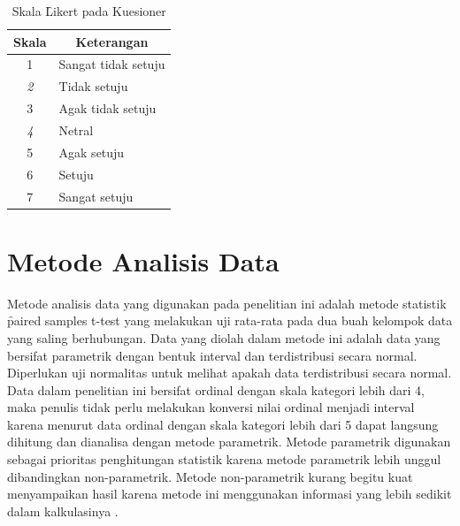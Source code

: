 \begin{enumerate}
\begin{enumerate}
		\begin{table}
			\centering
			\caption{Skala \f{Likert} pada Kuesioner}
			\label{tab:tab2}
			\begin{tabular}{|c|l|}
				\hline
				{\bf Skala} & \multicolumn{1}{c|}{{\bf Keterangan}} \\ \hline
				1           & Sangat tidak setuju                   \\ \hline
				{\it 2}     & Tidak setuju                          \\ \hline
				3           & Agak tidak setuju                     \\ \hline
				{\it 4}     & Netral                                \\ \hline
				5           & Agak setuju                           \\ \hline
				6           & Setuju                                \\ \hline
				7           & Sangat setuju                         \\ \hline                      
			\end{tabular}
		\end{table}
	\end{enumerate}
\end{enumerate}
\section{Metode Analisis Data} \label{subsec:analisis}
Metode analisis data yang digunakan pada penelitian ini adalah metode statistik \f{paired samples t-test} yang melakukan uji rata-rata pada dua buah kelompok data yang saling berhubungan. Data yang diolah dalam metode ini adalah data yang bersifat parametrik dengan bentuk interval dan terdistribusi secara normal. Diperlukan uji normalitas untuk melihat apakah data terdistribusi secara normal. Data dalam penelitian ini bersifat ordinal dengan skala kategori lebih dari 4, maka penulis tidak perlu melakukan konversi nilai ordinal menjadi interval karena menurut \citet{ho.newsom} data ordinal dengan skala kategori lebih dari 5 dapat langsung dihitung dan dianalisa dengan metode parametrik. Metode parametrik digunakan sebagai prioritas penghitungan statistik karena metode parametrik lebih unggul dibandingkan non-parametrik. Metode non-parametrik kurang begitu kuat menyampaikan hasil karena metode ini menggunakan informasi yang lebih sedikit dalam kalkulasinya \citep{article.csse}.
